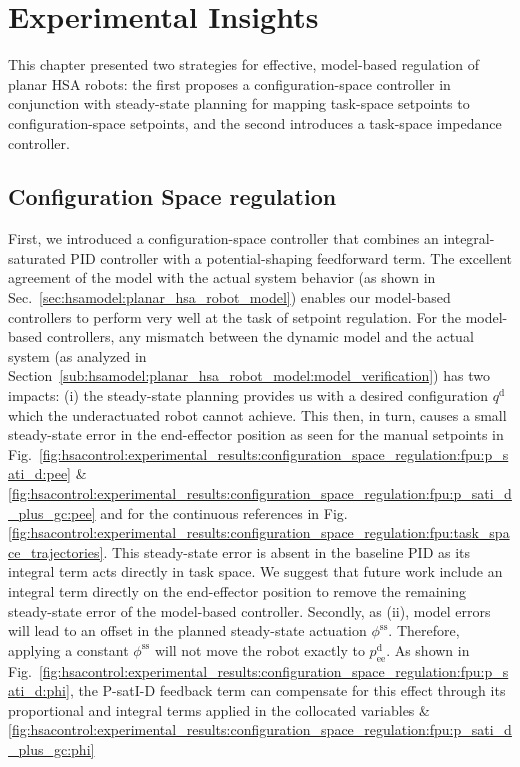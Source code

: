\section{Experimental Insights}
This chapter presented two strategies for effective, model-based regulation of planar \gls{HSA} robots: the first proposes a configuration-space controller in conjunction with steady-state planning for mapping task-space setpoints to configuration-space setpoints, and the second introduces a task-space impedance controller.

\subsection{Configuration Space regulation}

First, we introduced a configuration-space controller that combines an integral-saturated PID controller with a potential-shaping feedforward term.
The excellent agreement of the model with the actual system behavior (as shown in Sec.~\ref{sec:hsamodel:planar_hsa_robot_model}) enables our model-based controllers to perform very well at the task of setpoint regulation.
For the model-based controllers, any mismatch between the dynamic model and the actual system (as analyzed in Section~\ref{sub:hsamodel:planar_hsa_robot_model:model_verification}) has two impacts: (i) the steady-state planning provides us with a desired configuration $q^\mathrm{d}$ which the underactuated robot cannot achieve. This then, in turn, causes a small steady-state error in the end-effector position as seen for the manual setpoints in Fig.~\ref{fig:hsacontrol:experimental_results:configuration_space_regulation:fpu:p_sati_d:pee} \& \ref{fig:hsacontrol:experimental_results:configuration_space_regulation:fpu:p_sati_d_plus_gc:pee} 
and for the continuous references in Fig.\ref{fig:hsacontrol:experimental_results:configuration_space_regulation:fpu:task_space_trajectories}. This steady-state error is absent in the baseline PID as its integral term acts directly in task space. We suggest that future work include an integral term directly on the end-effector position to remove the remaining steady-state error of the model-based controller. Secondly, as (ii), model errors will lead to an offset in the planned steady-state actuation $\phi^\mathrm{ss}$. Therefore, applying a constant $\phi^\mathrm{ss}$ will not move the robot exactly to $p_\mathrm{ee}^\mathrm{d}$. As shown in Fig.~\ref{fig:hsacontrol:experimental_results:configuration_space_regulation:fpu:p_sati_d:phi}, the P-satI-D feedback term can compensate for this effect through its proportional and integral terms applied in the collocated variables \& \ref{fig:hsacontrol:experimental_results:configuration_space_regulation:fpu:p_sati_d_plus_gc:phi} 
